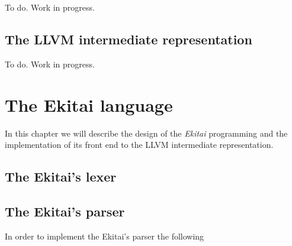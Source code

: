\documentclass[
    oneside,
    english,
    coorientadorbanca,
    embeddedlogo,
    noabntexcite
]{ufsc-thesis-rn46-2019}
\newcommand{\bnfvars}[1]{\langle\textrm{#1}\rangle}
\newcommand{\bnfor}[1]{\;\mid{} #1}
\newcommand{\bnfprod}[2]{\bnfvars{#1} &\ &::= & #2}
\newcommand{\bnfmore}[1]{ && \mid{} & #1}
\begin{document}
To do. Work in progress.

\section{The LLVM intermediate representation}

To do. Work in progress.

\chapter{The Ekitai language}\label{chapter:proposal}

In this chapter we will describe the design of the \textit{Ekitai} programming and the implementation of its front end to the LLVM intermediate representation.

\section{The Ekitai's lexer}



\section{The Ekitai's parser}

In order to implement the Ekitai's parser the following
\end{document}
